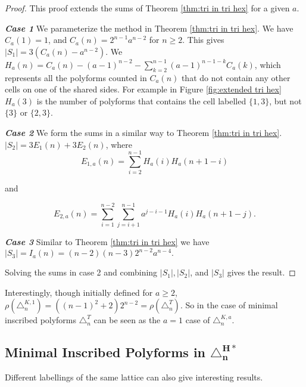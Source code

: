 \documentclass[12pt]{article}
\theoremstyle{plain}
\theoremstyle{definition}
\theoremstyle{remark}
\theoremstyle{definition}
\begin{document}
\begin{proof}
    This proof extends the sums of Theorem \ref{thm:tri in tri hex} for a given $a$.

    \textbf{\textit{Case 1}} We parameterize the method in Theorem \ref{thm:tri in tri hex}. We have $C_a(1)=1$, and $C_a(n)=2^{n-1}a^{n-2}$ for $n \geq 2$. This gives $|S_1|=3(C_a(n)-a^{n-2})$. We  $H_a(n) = C_a(n) - (a-1)^{n-2} - \sum_{k=2}^{n-1}(a-1)^{n-1-k}C_a(k)$, which represents all the polyforms counted in $C_a(n)$ that do not contain any other cells on one of the shared sides. For example in Figure \ref{fig:extended tri hex} $H_a(3)$ is the number of polyforms that contains the cell labelled $\{1,3\}$, but not $\{3\}$ or $\{2,3\}$. 

    \textbf{\textit{Case 2}} We form the sums in a similar way to Theorem \ref{thm:tri in tri hex}. $|S_2| = 3E_1(n) + 3E_2(n)$, where
    $$E_{1,a}(n) = \sum_{i=2}^{n-1}H_a(i)H_a(n+1-i)$$

    and
    
    $$E_{2,a}(n) = \sum_{i=1}^{n-2}\sum_{j=i+1}^{n-1}a^{j-i-1}H_a(i)H_a(n+1-j).$$

    \textbf{\textit{Case 3}} Similar to Theorem \ref{thm:tri in tri hex} we have $|S_3| = I_a(n) = (n-2)(n-3)2^{n-2}a^{n-4}.$ 

    Solving the sums in case 2 and combining $|S_1|, |S_2|$, and $|S_3|$ gives the result.
\end{proof}

Interestingly, though initially defined for $a \geq 2$, $\rho(\triangle^{K,1}_n) =  ((n-1)^2  + 2)2^{n-2} = \rho(\triangle^{T}_n)$. So in the case of minimal inscribed polyforms $\triangle^{T}_n$ can be seen as the $a=1$ case of $\triangle^{K,a}_n$.

\subsection{Minimal Inscribed Polyforms in \texorpdfstring{$\mathbf{\triangle^{H*}_n}$}{H*n}}

Different labellings of the same lattice can also give interesting results. 
\end{document}
